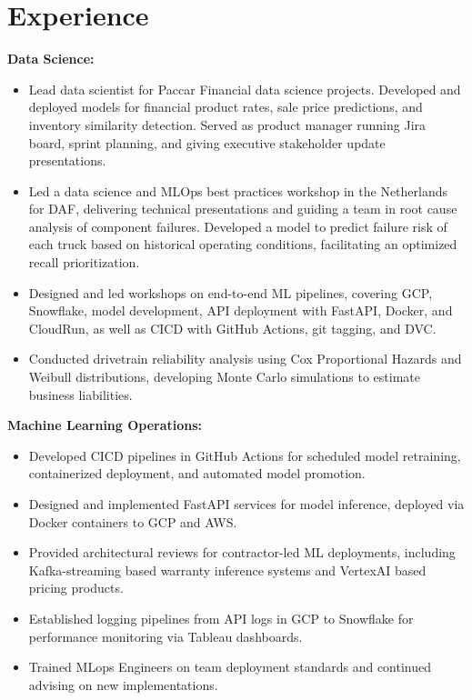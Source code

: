 \documentclass[12pt,a4paper]{moderncv}
\begin{document}
\section{Experience}
\item \textbf{Data Science:}
\begin{itemize}
    \item Lead data scientist for Paccar Financial data science projects. Developed and deployed models for financial product rates, sale price predictions, and inventory similarity detection. Served as product manager running Jira board, sprint planning, and giving executive stakeholder update presentations.
    \item Led a data science and MLOps best practices workshop in the Netherlands for DAF, delivering technical presentations and guiding a team in root cause analysis of component failures. Developed a model to predict failure risk of each truck based on historical operating conditions, facilitating an optimized recall prioritization. 
    \item Designed and led workshops on end-to-end ML pipelines, covering GCP, Snowflake, model development, API deployment with FastAPI, Docker, and CloudRun, as well as CICD with GitHub Actions, git tagging, and DVC.
    \item Conducted drivetrain reliability analysis using Cox Proportional Hazards and Weibull distributions, developing Monte Carlo simulations to estimate business liabilities.
\end{itemize}
\item \textbf{Machine Learning Operations:}
\begin{itemize}
    \item Developed CICD pipelines in GitHub Actions for scheduled model retraining, containerized deployment, and automated model promotion.
    \item Designed and implemented FastAPI services for model inference, deployed via Docker containers to GCP and AWS.
    \item Provided architectural reviews for contractor-led ML deployments, including Kafka-streaming based warranty inference systems and VertexAI based pricing products.
    \item Established logging pipelines from API logs in GCP to Snowflake for performance monitoring via Tableau dashboards.
    \item Trained MLops Engineers on team deployment standards and continued advising on new implementations.
\end{itemize}
\end{document}
